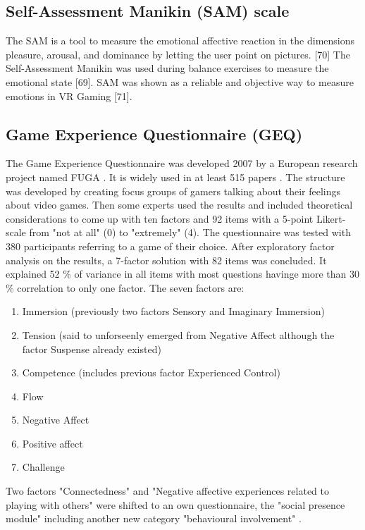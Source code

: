 \subsection{Self-Assessment Manikin (SAM) scale}
The SAM is a tool to measure the emotional affective reaction in the dimensions pleasure, arousal, and dominance by letting the user point on pictures. [70] The Self-Assessment Manikin was used during balance exercises to measure the emotional state [69]. SAM was shown as a reliable and objective way to measure
emotions in VR Gaming [71].

\subsection{Game Experience Questionnaire (GEQ)}
The Game Experience Questionnaire was developed 2007 by a European research project named FUGA \cite{poels2007game}. It is widely used in at least 515 papers \cite{law2018systematic}. The structure was developed by creating focus groups of gamers talking about their feelings about video games. Then some experts used the results and included theoretical considerations to come up with ten factors and 92 items with a 5-point Likert-scale from "not at all" (0) to "extremely" (4).
The questionnaire was tested with 380 participants referring to a game of their choice. After exploratory factor analysis on the results, a 7-factor solution with 82 items was concluded. It explained 52 \% of variance in all items with most questions havinge more than 30 \% correlation to only one factor. The seven factors are:
\begin{enumerate}
	\item Immersion (previously two factors Sensory and Imaginary Immersion)
	\item Tension (said to unforseenly emerged from Negative Affect although the factor Suspense already existed)
	\item Competence (includes previous factor Experienced Control)
	\item Flow
	\item Negative Affect
	\item Positive affect
	\item Challenge
\end{enumerate}
Two factors "Connectedness" and "Negative affective experiences related to playing with others" were shifted to an own questionnaire, the "social presence module" including another new category "behavioural involvement" .

